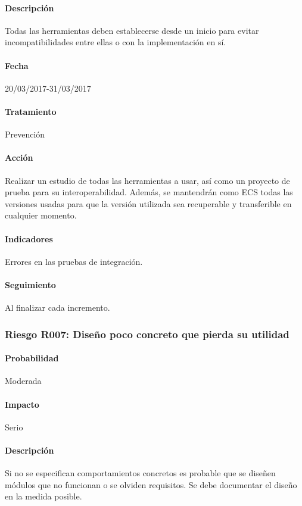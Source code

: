 \documentclass[10pt,a4paper]{article}
\begin{document}
				\paragraph{Descripción} Todas las herramientas deben establecerse desde un inicio para evitar incompatibilidades entre ellas o con la implementación en sí.
				\paragraph{Fecha} 20/03/2017-31/03/2017 %
				\paragraph{Tratamiento} Prevención %
				\paragraph{Acción} Realizar un estudio de todas las herramientas a usar, así como un proyecto de prueba para su interoperabilidad. Además, se mantendrán como ECS todas las versiones usadas para que la versión utilizada sea recuperable y transferible en cualquier momento. %
				\paragraph{Indicadores} Errores en las pruebas de integración. %
				\paragraph{Seguimiento}	Al finalizar cada incremento. %
				
			\subsubsection{Riesgo R007: Diseño poco concreto que pierda su utilidad}
				\paragraph{Probabilidad} Moderada
				\paragraph{Impacto}	Serio
				\paragraph{Descripción} Si no se especifican comportamientos concretos es probable que se diseñen módulos que no funcionan o se olviden requisitos. Se debe documentar el diseño en la medida posible.
\end{document}
